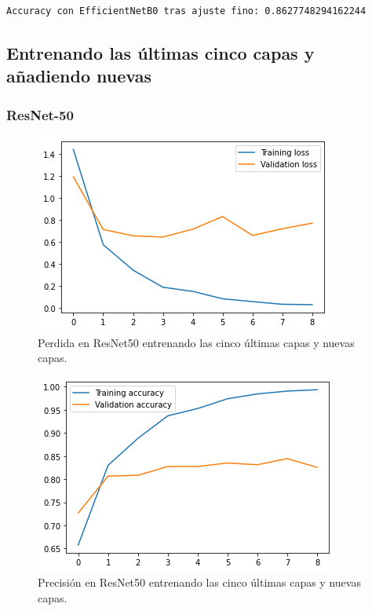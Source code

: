 \begin{lstlisting}
Accuracy con EfficientNetB0 tras ajuste fino: 0.8627748294162244
\end{lstlisting}











\subsection{Entrenando las últimas cinco capas y añadiendo nuevas}

\subsubsection{ResNet-50}

\begin{figure}[H]
  \centering
  \includegraphics[width=0.5\linewidth]{Imagenes/entrenamiento_redes/5-ult/resnet_5ult_loss.png}
  \caption{Perdida en ResNet50 entrenando las cinco últimas capas y nuevas capas.}
\end{figure}

\begin{figure}[H]
  \centering
  \includegraphics[width=0.5\linewidth]{Imagenes/entrenamiento_redes/5-ult/resnet_5ult_acc.png}
  \caption{Precisión en ResNet50 entrenando las cinco últimas capas y nuevas capas.}
\end{figure}

